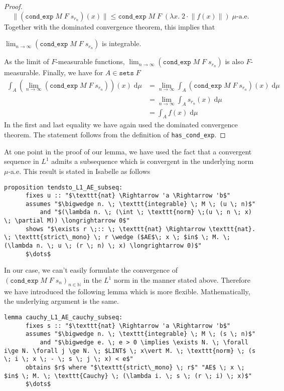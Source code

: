 \begin{proof}
	\[
		\lVert (\texttt{cond\_exp} \; M \; F \; s_{r_n}) (x) \rVert \le \texttt{cond\_exp} \; M \; F \; (\lambda x. \; 2 \cdot \lVert f(x)\rVert) \; \mu\textrm{-a.e.}
	\]
	Together with the dominated convergence theorem, this implies that \par\noindent$\lim_{n \to \infty} (\texttt{cond\_exp} \; M \; F \; s_{r_n})$ is integrable. \par\noindent As the limit of $F$-measurable functions, $\lim_{n \to \infty} (\texttt{cond\_exp} \; M \; F \; s_{r_n})$ is also $F$-measurable. Finally, we have for $A \in \texttt{sets} \; F$
	\begin{align*}
		\int_A (\lim_{n \to \infty} (\texttt{cond\_exp} \; M \; F \; s_{r_n}))(x) \; \textrm{d}\mu &= \lim_{n \to \infty} \int_A (\texttt{cond\_exp} \; M \; F \; s_{r_n})(x) \; \textrm{d}\mu \\
		&= \lim_{n \to \infty} \int_A s_{r_n}(x) \; \textrm{d}\mu \\
		&= \int_A f(x) \; \textrm{d}\mu 
	\end{align*}
	In the first and last equality we have again used the dominated convergence theorem. The statement follows from the definition of \texttt{has\_cond\_exp}.
\end{proof}

At one point in the proof of our lemma, we have used the fact that a convergent sequence in $L^1$ admits a subsequence which is convergent in the underlying norm $\mu$-a.e. This result is stated in Isabelle as follows

{\small
	\begin{lstlisting}[style=isabelle]
	proposition tendsto_L1_AE_subseq:
	  fixes u :: "$\texttt{nat} \Rightarrow 'a \Rightarrow 'b$"
	  assumes "$\bigwedge n. \; \texttt{integrable} \; M \; (u \; n)$"
		  and "$(\lambda n. \; (\int \; \texttt{norm} \;(u \; n \; x) \; \partial M)) \longrightarrow 0$"
	  shows "$\exists r \;:: \; \texttt{nat} \Rightarrow \texttt{nat}. \; \texttt{strict\_mono} \; r \wedge ($AE$\; x \; $in$ \; M. \; (\lambda n. \; u \; (r \; n) \; x) \longrightarrow 0)$"
	  $\dots$
	\end{lstlisting}
}

In our case, we can't easily formulate the convergence of $(\texttt{cond\_exp} \; M \; F \; s_n)_{n \in \mathbb{N}}$ in the $L^1$ norm in the manner stated above. Therefore we have introduced the following lemma which is more flexible. Mathematically, the underlying argument is the same.

\begin{isalemma}
{\small
	\begin{lstlisting}[style=isabelle]
	lemma cauchy_L1_AE_cauchy_subseq:
	  fixes s :: "$\texttt{nat} \Rightarrow 'a \Rightarrow 'b$"
	  assumes "$\bigwedge n. \; \texttt{integrable} \; M \; (s \; n)$"
		  and "$\bigwedge e. \; e > 0 \implies \exists N. \; \forall i\ge N. \forall j \ge N. \; $LINT$ \; x\vert M. \; \texttt{norm} \; (s \; i \; x \; - \; s \; j \; x) < e$"
	  obtains $r$ where "$\texttt{strict\_mono} \; r$" "AE$ \; x \; $in$ \; M. \; \texttt{Cauchy} \; (\lambda i. \; s \; (r \; i) \; x)$"
	  $\dots$
	\end{lstlisting}
}
\end{isalemma}


